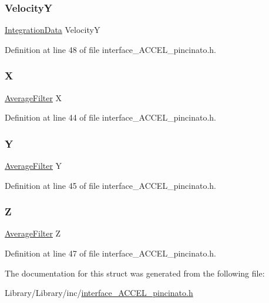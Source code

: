 \subsubsection{\texorpdfstring{VelocityY}{VelocityY}}
{\footnotesize\ttfamily \mbox{\hyperlink{filter__math__pincinato_8h_a614628710e855bdeb4949c83265e87e6}{Integration\+Data}} VelocityY}



Definition at line 48 of file interface\+\_\+\+A\+C\+C\+E\+L\+\_\+pincinato.\+h.

\mbox{\label{struct_process_data___a1dddeebb5e500ffea1704c56bad3e5de}} 
\subsubsection{\texorpdfstring{X}{X}}
{\footnotesize\ttfamily \mbox{\hyperlink{filter__math__pincinato_8h_a05751bcbb0782121ff05ae3b7fc37dac}{Average\+Filter}} X}



Definition at line 44 of file interface\+\_\+\+A\+C\+C\+E\+L\+\_\+pincinato.\+h.

\mbox{\label{struct_process_data___a999e007debe5468384855f5109e979c8}} 
\subsubsection{\texorpdfstring{Y}{Y}}
{\footnotesize\ttfamily \mbox{\hyperlink{filter__math__pincinato_8h_a05751bcbb0782121ff05ae3b7fc37dac}{Average\+Filter}} Y}



Definition at line 45 of file interface\+\_\+\+A\+C\+C\+E\+L\+\_\+pincinato.\+h.

\mbox{\label{struct_process_data___adcecb30f0d09efbdf979b7162fd73a59}} 
\subsubsection{\texorpdfstring{Z}{Z}}
{\footnotesize\ttfamily \mbox{\hyperlink{filter__math__pincinato_8h_a05751bcbb0782121ff05ae3b7fc37dac}{Average\+Filter}} Z}



Definition at line 47 of file interface\+\_\+\+A\+C\+C\+E\+L\+\_\+pincinato.\+h.



The documentation for this struct was generated from the following file\+:\begin{DoxyCompactItemize}
\item 
Library/\+Library/inc/\mbox{\hyperlink{interface___a_c_c_e_l__pincinato_8h}{interface\+\_\+\+A\+C\+C\+E\+L\+\_\+pincinato.\+h}}\end{DoxyCompactItemize}

